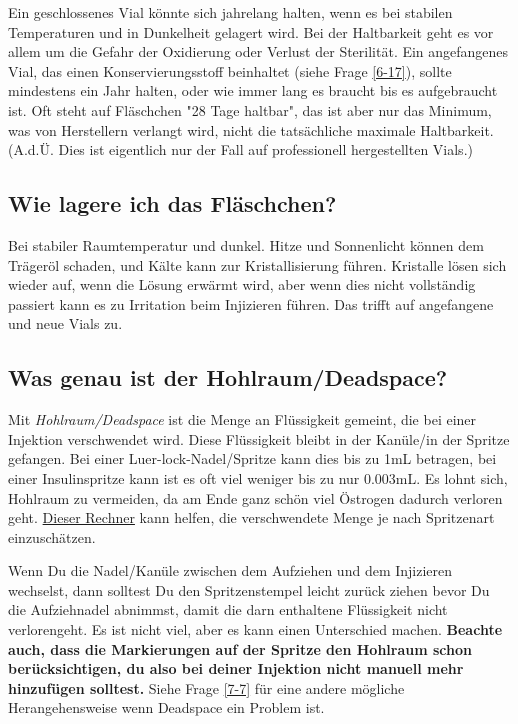 \documentclass{article}
\begin{document}
{Ein geschlossenes Vial könnte sich jahrelang halten, wenn es bei stabilen Temperaturen und in Dunkelheit gelagert wird. Bei der Haltbarkeit geht es vor allem um die Gefahr der Oxidierung oder Verlust der Sterilität. Ein angefangenes Vial, das einen Konservierungsstoff beinhaltet (siehe Frage \ref{6-17}), sollte mindestens ein Jahr halten, oder wie immer lang es braucht bis es aufgebraucht ist. Oft steht auf Fläschchen "28 Tage haltbar", das ist aber nur das Minimum, was von Herstellern verlangt wird, nicht die tatsächliche maximale Haltbarkeit. (A.d.Ü. Dies ist eigentlich nur der Fall auf professionell hergestellten Vials.)

\subsection{Wie lagere ich das Fläschchen?}

Bei stabiler Raumtemperatur und dunkel. Hitze und Sonnenlicht können dem Trägeröl schaden, und Kälte kann zur Kristallisierung führen. Kristalle lösen sich wieder auf, wenn die Lösung erwärmt wird, aber wenn dies nicht vollständig passiert kann es zu Irritation beim Injizieren führen. Das trifft auf angefangene und neue Vials zu.

\subsection{Was genau ist der Hohlraum/Deadspace?}\label{5-26}

Mit \textit{Hohlraum/Deadspace} ist die Menge an Flüssigkeit gemeint, die bei einer Injektion verschwendet wird. Diese Flüssigkeit bleibt in der Kanüle/in der Spritze gefangen. Bei einer Luer-lock-Nadel/Spritze kann dies bis zu 1mL betragen, bei einer Insulinspritze kann ist es oft viel weniger bis zu nur 0.003mL. Es lohnt sich, Hohlraum zu vermeiden, da am Ende ganz schön viel Östrogen dadurch verloren geht. \href{https://hrtcafe.net/Calc/}{Dieser Rechner} kann helfen, die verschwendete Menge je nach Spritzenart einzuschätzen.

Wenn Du die Nadel/Kanüle zwischen dem Aufziehen und dem Injizieren wechselst, dann solltest Du den Spritzenstempel leicht zurück ziehen bevor Du die Aufziehnadel abnimmst, damit die darn enthaltene Flüssigkeit nicht verlorengeht. Es ist nicht viel, aber es kann einen Unterschied machen. \textbf{Beachte auch, dass die Markierungen auf der Spritze den Hohlraum schon berücksichtigen, du also bei deiner Injektion nicht manuell mehr hinzufügen solltest.} Siehe Frage \ref{7-7} für eine andere mögliche Herangehensweise wenn Deadspace ein Problem ist.

}
\end{document}
